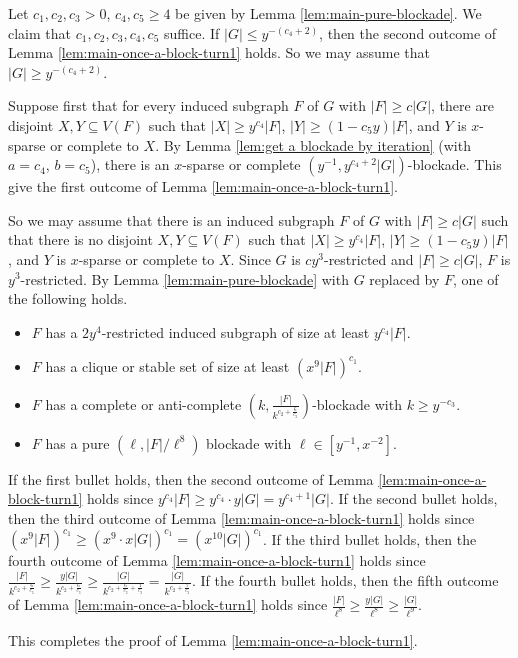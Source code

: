 \documentclass[a4paper,11pt]{article}
\let\oldendproof\endproof
\renewenvironment{proof}[1][\proofname]{%
	\oldproof[\normalfont\bfseries #1]%
}{\oldendproof}
\begin{document}
    \begin{proof}
        Let $c_1,c_2,c_3>0$, $c_4,c_5\geq 4$ be given by Lemma \ref{lem:main-pure-blockade}. 
        We claim that $c_1,c_2,c_3,c_4,c_5$ suffice. 
        If $|G|\leq y^{-(c_4+2)}$, then the second outcome of Lemma \ref{lem:main-once-a-block-turn1} holds.
        So we may assume that $|G|\geq y^{-(c_4+2)}$. 
        
        Suppose first that for every induced subgraph $F$ of $G$ with $|F|\geq c|G|$, there are disjoint $X,Y\subseteq V(F)$ such that $|X|\geq y^{c_4}|F|$, $|Y|\geq (1-c_5y)|F|$, and $Y$ is $x$-sparse or complete to $X$. 
        By Lemma \ref{lem:get a blockade by iteration} (with $a=c_4$, $b=c_5$), there is an $x$-sparse or complete $(y^{-1},y^{c_4+2}|G|)$-blockade. 
        This give the first outcome of Lemma \ref{lem:main-once-a-block-turn1}. 
        
        So we may assume that there is an induced subgraph $F$ of $G$ with $|F|\geq c|G|$ such that there is no disjoint $X,Y\subseteq V(F)$ such that $|X|\geq y^{c_4}|F|$, $|Y|\geq (1-c_5y)|F|$, and $Y$ is $x$-sparse or complete to $X$. 
        Since $G$ is $cy^3$-restricted and $|F|\geq c|G|$, $F$ is $y^3$-restricted. 
        By Lemma \ref{lem:main-pure-blockade} with $G$ replaced by $F$, one of the following holds.
        \begin{itemize}
    
            \item $F$ has a $2y^4$-restricted induced subgraph of size at least $y^{c_4}|F|$.
            
            \item $F$ has a clique or stable set of size at least $(x^{9}|F|)^{c_1}$. 
            
            \item $F$ has a complete or anti-complete $(k,\frac{|F|}{k^{c_2+\frac{6}{c_3}}})$-blockade with $k\geq y^{-c_3}$.
            
            \item $F$ has a pure $(\ell,|F|/\ell^{8})$ blockade with $\ell\in[y^{-1}, x^{-2}]$.
            
        \end{itemize}
        
        If the first bullet holds, then the second outcome of Lemma \ref{lem:main-once-a-block-turn1} holds since $y^{c_4}|F|\geq y^{c_4}\cdot y|G|=y^{c_4+1}|G|$. If the second bullet holds, then the third outcome of Lemma \ref{lem:main-once-a-block-turn1} holds since $(x^{9}|F|)^{c_1}\geq (x^{9}\cdot x|G|)^{c_1}=(x^{10}|G|)^{c_1}$. If the third bullet holds, then the fourth outcome of Lemma \ref{lem:main-once-a-block-turn1} holds since $\frac{|F|}{k^{c_2+\frac{6}{c_3}}}\geq \frac{y|
        G|}{k^{c_2+\frac{6}{c_3}}}\geq \frac{|G|}{k^{c_2+\frac{6}{c_3}+\frac{1}{c_3}}}=\frac{|G|}{k^{c_2+\frac{7}{c_3}}}$. If the fourth bullet holds, then the fifth outcome of Lemma \ref{lem:main-once-a-block-turn1} holds since $\frac{|F|}{\ell^{8}}\geq \frac{y|G|}{\ell^{8}}\geq \frac{|G|}{\ell^{9}}$.  
        
        This completes the proof of Lemma \ref{lem:main-once-a-block-turn1}.
    \end{proof}
\end{document}
